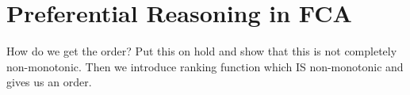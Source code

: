 \section{Preferential Reasoning in FCA}
\label{section—preferential FCA}


How do we get the order? Put this on hold and show that this is not completely non-monotonic. Then we introduce ranking function which IS non-monotonic and gives us an order.